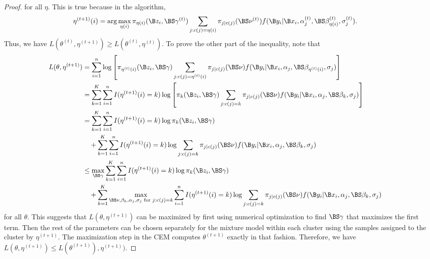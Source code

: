 \begin{proof}
for all $\eta$. This is true because in the algorithm, $$\eta^{(t+1)}(i) = \arg \max_{\eta(i)} \pi_{\eta(i)}(\B z_{i},\BS \gamma^{(t)})\sum_{j:c(j)=\eta(i)}\pi_{j|c(j)}(\BS\nu^{(t)})f(\B y_{i}|\B x_{i},\alpha_{j}^{(t)},\BS\beta^{(t)}_{\eta(i)},\sigma^{(t)}_{j}).$$
   Thus, we have $    L(\theta^{(t)},\eta^{(t+1)})\geq L(\theta^{(t)},\eta^{(t)})$. To prove the other part of the inequality, note that
       \begin{align*}
 L(\theta,\eta^{(t+1)})  &= \sum^{n}_{i=1}\log\left[\pi_{\eta^{(t)}(i)}(\B z_{i},\BS \gamma)\sum_{j:c(j)=\eta^{(t)}(i)}\pi_{j|c(j)}(\BS\nu)f(\B y_{i}|\B x_{i},\alpha_{j},\BS\beta_{\eta^{(t)}(i)},\sigma_{j})\right]\\
 &= \sum^{K}_{k=1}\sum^{n}_{i=1}I(\eta^{(t+1)}(i) = k)\log\left[\pi_{k}(\B z_{i},\BS \gamma)\sum_{j:c(j)=k}\pi_{j|c(j)}(\BS\nu)f(\B y_{i}|\B x_{i},\alpha_{j},\BS\beta_{k},\sigma_{j})\right]\\
  &= \sum^{K}_{k=1}\sum^{n}_{i=1}I(\eta^{(t+1)}(i) = k)\log\pi_{k}(\B z_{i},\BS \gamma)\\
  &\quad+\sum^{K}_{k=1}\sum^{n}_{i=1}I(\eta^{(t+1)}(i) = k)\log \sum_{j:c(j)=k}\pi_{j|c(j)}(\BS\nu)f(\B y_{i}|\B x_{i},\alpha_{j},\BS\beta_{k},\sigma_{j})\\
    &\leq\max_{\BS\gamma} \sum^{K}_{k=1}\sum^{n}_{i=1}I(\eta^{(t+1)}(i) = k)\log\pi_{k}(\B z_{i},\BS \gamma)\\
  &\quad+\sum^{K}_{k=1}\max_{\BS \nu,\beta_{k},\alpha_{j},\sigma_{j}\text{ for }j:c(j)=k}\sum^{n}_{i=1}I(\eta^{(t+1)}(i) = k)\log \sum_{j:c(j)=k}\pi_{j|c(j)}(\BS\nu)f(\B y_{i}|\B x_{i},\alpha_{j},\BS\beta_{k},\sigma_{j})\\
    \end{align*}
    for all $\theta$. This suggests that $L(\theta,\eta^{(t+1)})$ can be maximized by first using numerical optimization to find $\BS\gamma$ that maximizes the first term. Then the rest of the parameters can be chosen separately for the mixture model within each cluster using the samples assigned to the cluster by $\eta^{(t+1)}$. The maximization step in the CEM computes $\theta^{(t+1)}$ exactly in that fashion. Therefore, we have $L(\theta,\eta^{(t+1)})\leq L(\theta^{(t+1)}),\eta^{(t+1)})$. 
    \end{proof}